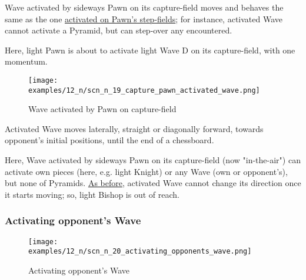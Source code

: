 \vspace*{-0.5\baselineskip}
Wave activated by sideways Pawn on its capture-field moves and behaves the same
as the one
\hyperref[fig:scn_n_16_sideways_pawn_init]{activated on Pawn's step-fields}; for
instance, activated Wave cannot activate a Pyramid, but can step-over any
encountered.

Here, light Pawn is about to activate light Wave D on its capture-field, with one
momentum.

\clearpage %

\vspace*{-2.1\baselineskip}
\noindent
\begin{figure}[!h]
\texttt{[image: examples/12\_n/scn\_n\_19\_capture\_pawn\_activated\_wave.png]}
\vspace*{-1.4\baselineskip}
\caption{Wave activated by Pawn on capture-field}
\label{fig:scn_n_19_capture_pawn_activated_wave}
\end{figure}

\vspace*{-0.5\baselineskip}
Activated Wave moves laterally, straight or diagonally forward, towards opponent's
initial positions, until the end of a chessboard.

Here, Wave activated by sideways Pawn on its capture-field (now "in-the-air") can
activate own pieces (here, e.g. light Knight) or any Wave (own or opponent's),
but none of Pyramids.
\hyperref[fig:scn_n_17_sideways_pawn_activated_wave]{As before}, activated Wave
cannot change its direction once it starts moving; so, light Bishop is out of reach.

\clearpage %

\subsubsection*{Activating opponent's Wave}
\label{sec:Nineteen/Sideways Pawns/Activating Wave/Activating opponent's Wave}

\vspace*{-1.4\baselineskip}
\noindent
\begin{figure}[!h]
\texttt{[image: examples/12\_n/scn\_n\_20\_activating\_opponents\_wave.png]}
\vspace*{-1.4\baselineskip}
\caption{Activating opponent's Wave}
\label{fig:scn_n_20_activating_opponents_wave}
\end{figure}

